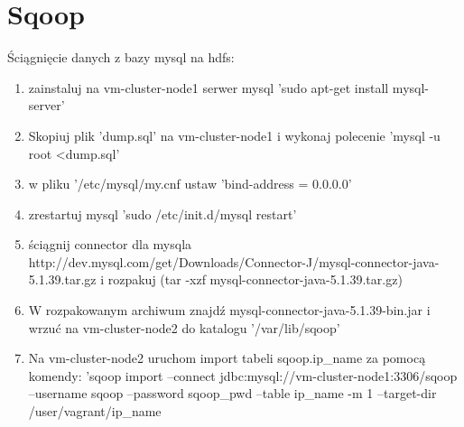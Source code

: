 \documentclass[11pt]{article}
\begin{document}
\section*{Sqoop}

Ściągnięcie danych z bazy mysql na hdfs:
\begin{enumerate}
\item zainstaluj na vm-cluster-node1 serwer mysql 'sudo apt-get install mysql-server'
\item Skopiuj plik 'dump.sql' na vm-cluster-node1 i wykonaj polecenie 'mysql -u root \textless dump.sql'
\item w pliku '/etc/mysql/my.cnf ustaw 'bind-address = 0.0.0.0'
\item zrestartuj mysql 'sudo /etc/init.d/mysql restart'
\item ściągnij connector dla mysqla http://dev.mysql.com/get/Downloads/Connector-J/mysql-connector-java-5.1.39.tar.gz i rozpakuj (tar -xzf mysql-connector-java-5.1.39.tar.gz)
\item W rozpakowanym archiwum znajdź mysql-connector-java-5.1.39-bin.jar i wrzuć na vm-cluster-node2 do katalogu '/var/lib/sqoop'
\item Na vm-cluster-node2 uruchom import tabeli sqoop.ip\_name za pomocą komendy: 'sqoop import --connect jdbc:mysql://vm-cluster-node1:3306/sqoop --username sqoop --password sqoop\_pwd --table ip\_name -m 1 --target-dir /user/vagrant/ip\_name
\end{enumerate}
\end{document}
